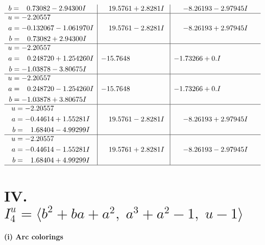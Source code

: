 \documentclass[1p]{elsarticle_modified}
\theoremstyle{definition}
\begin{document}
$$\begin{array}{c|c|c}
\begin{aligned}
b &= \phantom{-}0.73082 - 2.94300 I\end{aligned}
 & \phantom{-}19.5761 + 2.8281 I & -8.26193 - 2.97945 I \\ \hline\begin{aligned}
u &= -2.20557\phantom{ +0.000000I} \\
a &= -0.132067 - 1.061970 I \\
b &= \phantom{-}0.73082 + 2.94300 I\end{aligned}
 & \phantom{-}19.5761 - 2.8281 I & -8.26193 + 2.97945 I \\ \hline\begin{aligned}
u &= -2.20557\phantom{ +0.000000I} \\
a &= \phantom{-}0.248720 + 1.254260 I \\
b &= -1.03878 - 3.80675 I\end{aligned}
 & -15.7648\phantom{ +0.000000I} & -1.73266 + 0. I\phantom{ +0.000000I} \\ \hline\begin{aligned}
u &= -2.20557\phantom{ +0.000000I} \\
a &= \phantom{-}0.248720 - 1.254260 I \\
b &= -1.03878 + 3.80675 I\end{aligned}
 & -15.7648\phantom{ +0.000000I} & -1.73266 + 0. I\phantom{ +0.000000I} \\ \hline\begin{aligned}
u &= -2.20557\phantom{ +0.000000I} \\
a &= -0.44614 + 1.55281 I \\
b &= \phantom{-}1.68404 - 4.99299 I\end{aligned}
 & \phantom{-}19.5761 - 2.8281 I & -8.26193 + 2.97945 I \\ \hline\begin{aligned}
u &= -2.20557\phantom{ +0.000000I} \\
a &= -0.44614 - 1.55281 I \\
b &= \phantom{-}1.68404 + 4.99299 I\end{aligned}
 & \phantom{-}19.5761 + 2.8281 I & -8.26193 - 2.97945 I\\
 \hline 
 \end{array}$$\newpage\newpage\renewcommand{\arraystretch}{1}
\centering \section*{IV. $I^u_{4}= \langle b^2+b a+a^2,\;a^3+a^2-1,\;u-1 \rangle$}
\flushleft \textbf{(i) Arc colorings}\\
\end{document}
